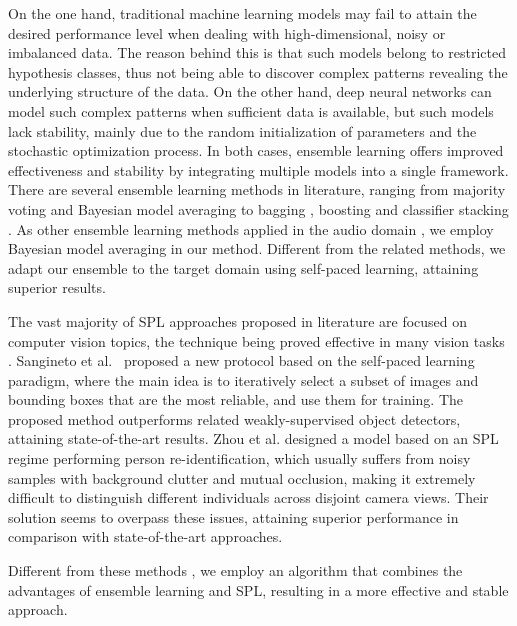 \documentclass[a4paper]{article}
\begin{document}
On the one hand, traditional machine learning models may fail to attain the desired performance level when dealing with high-dimensional, noisy or imbalanced data. The reason behind this is that such models belong to restricted hypothesis classes, thus not being able to discover complex patterns revealing the underlying structure of the data. On the other hand, deep neural networks can model such complex patterns when sufficient data is available, but such models lack stability, mainly due to the random initialization of parameters and the stochastic optimization process. In both cases, ensemble learning \cite{dong2020survey,Zhang-INTERSPEECH-2015} offers improved effectiveness and stability by integrating multiple models into a single framework. There are several ensemble learning methods in literature, ranging from majority voting \cite{raza2019improving} and Bayesian model averaging \cite{fersini2014sentiment} to bagging \cite{bryll2003attribute}, boosting \cite{jianqiang2016combing} and classifier stacking \cite{sikora2015modified}. As other ensemble learning methods applied in the audio domain \cite{elowsson2017predicting, zahid2015optimized}, we employ Bayesian model averaging in our method. Different from the related methods, we adapt our ensemble to the target domain using self-paced learning, attaining superior results.

The vast majority of SPL approaches proposed in literature are focused on computer vision topics, the technique being proved effective in many vision tasks \cite{sangineto2018self, zhou2018deep}. Sangineto et al.~\cite{sangineto2018self} proposed a new protocol based on the self-paced learning paradigm, where the main idea is to iteratively select a subset of images and bounding boxes that are the most reliable, and use them for training. The proposed method outperforms related weakly-supervised object detectors, attaining state-of-the-art results. Zhou et al. \cite{zhou2018deep} designed a model based on an SPL regime performing person re-identification, which usually suffers from noisy samples with background clutter and mutual occlusion, making it extremely difficult to distinguish different individuals across disjoint camera views. Their solution seems to overpass these issues, attaining superior performance in comparison with state-of-the-art approaches.

Different from these methods \cite{sangineto2018self, zhou2018deep}, we employ an algorithm that combines the advantages of ensemble learning and SPL, resulting in a more effective and stable approach.
\end{document}
